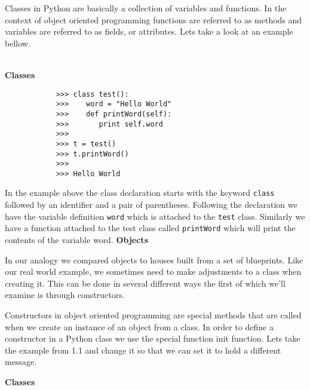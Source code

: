 \documentclass[letterpaper,11pt]{article}
\begin{document}
\par{Classes in Python are basically a collection of variables and functions. In
the context of object oriented programming functions are referred to as methods
and variables are referred to as fields, or attributes. Lets take a look at an
example bellow.}
\\ \\
\begin{minipage}{.5\textwidth}
    \small \textbf{Classes}
    \begin{tcolorbox}
        \begin{footnotesize}
            \begin{verbatim}
            >>> class test():
            >>>    word = "Hello World"
            >>>    def printWord(self):
            >>>       print self.word
            >>>
            >>> t = test()
            >>> t.printWord()
            >>>
            >>> Hello World
            \end{verbatim}
        \end{footnotesize}
    \end{tcolorbox}
\end{minipage}
\par{In the example above the class declaration starts with the keyword
\texttt{class} followed by an identifier and a pair of parentheses. Following
the declaration we have the variable definition \texttt{word} which is
attached to the \texttt{test} class. Similarly we have a function attached to the
test class called \texttt{printWord} which will print the contents of the
variable word.}
\textbf{Objects}
\par{In our analogy we compared objects to houses built from a set of
blueprints.  Like our real world example, we sometimes need to make adjustments
to a class when creating it. This can be done in several different ways the
first of which we'll examine is through constructors.} 
\par{Constructors in object oriented programming are special methods that are
    called when we create an instance of an object from a class. In order to
    define a constructor in a Python class we use the special function init
    function.  Lets take the example from 1.1 and change it so that we can set
it to hold a different message.}
\begin{minipage}{.5\textwidth}
    \small \textbf{Classes}
    \begin{tcolorbox}
    \end{tcolorbox}
\end{minipage}
\end{document}

